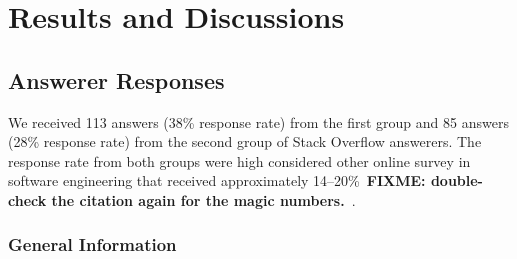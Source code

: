 \documentclass{svjour3}                     %
\newcommand\FIXME[1]{\textbf{FIXME: #1}}
\begin{document}
\section{Results and Discussions}

\subsection{Answerer Responses}
We received 113 answers (38\% response rate) from the first group and 85 answers
(28\% response rate) from the second group of Stack Overflow answerers. The response
rate from both groups were high considered other online survey in software
engineering that received approximately 14--20\%~\FIXME{double-check the
	citation again for the magic numbers.}~\citep{Punter2003}.

\subsubsection*{General Information}

\end{document}
